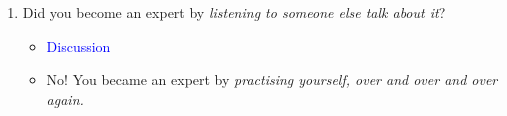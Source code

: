 \documentclass[hidelinks]{article}
\begin{document}
\begin{enumerate}
\begin{enumerate}
					\item Did you become an expert by \emph{\textcolor{smured}{listening to someone else talk about it}}?
						\begin{itemize}
							\item \textcolor{blue}{Discussion}
							\item No! You became an expert by \emph{\textcolor{smured}{practising yourself, over and over and over again.}}
						\end{itemize}
				\end{enumerate}
		\end{enumerate}
\end{document}
